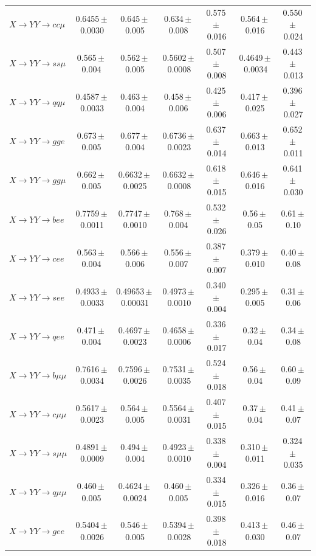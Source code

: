 \documentclass[12pt]{article}   %
\begin{document}
\begin{landscape}
{\begin{longtable}{@{\extracolsep{\fill}}lcccccc@{}}
$X\to YY\to cc\mu$ & 0.6455\,$\pm$\,0.0030 & 0.645\,$\pm$\,0.005 & 0.634\,$\pm$\,0.008 & 0.575\,$\pm$\,0.016 & 0.564\,$\pm$\,0.016 & 0.550\,$\pm$\,0.024 \\
$X\to YY\to ss\mu$ & 0.565\,$\pm$\,0.004 & 0.562\,$\pm$\,0.005 & 0.5602\,$\pm$\,0.0008 & 0.507\,$\pm$\,0.008 & 0.4649\,$\pm$\,0.0034 & 0.443\,$\pm$\,0.013 \\
$X\to YY\to qq\mu$ & 0.4587\,$\pm$\,0.0033 & 0.463\,$\pm$\,0.004 & 0.458\,$\pm$\,0.006 & 0.425\,$\pm$\,0.006 & 0.417\,$\pm$\,0.025 & 0.396\,$\pm$\,0.027 \\
$X\to YY\to gge$ & 0.673\,$\pm$\,0.005 & 0.677\,$\pm$\,0.004 & 0.6736\,$\pm$\,0.0023 & 0.637\,$\pm$\,0.014 & 0.663\,$\pm$\,0.013 & 0.652\,$\pm$\,0.011 \\
$X\to YY\to gg\mu$ & 0.662\,$\pm$\,0.005 & 0.6632\,$\pm$\,0.0025 & 0.6632\,$\pm$\,0.0008 & 0.618\,$\pm$\,0.015 & 0.646\,$\pm$\,0.016 & 0.641\,$\pm$\,0.030 \\
\midrule
$X\to YY\to bee$ & 0.7759\,$\pm$\,0.0011 & 0.7747\,$\pm$\,0.0010 & 0.768\,$\pm$\,0.004 & 0.532\,$\pm$\,0.026 & 0.56\,$\pm$\,0.05 & 0.61\,$\pm$\,0.10 \\
$X\to YY\to cee$ & 0.563\,$\pm$\,0.004 & 0.566\,$\pm$\,0.006 & 0.556\,$\pm$\,0.007 & 0.387\,$\pm$\,0.007 & 0.379\,$\pm$\,0.010 & 0.40\,$\pm$\,0.08 \\
$X\to YY\to see$ & 0.4933\,$\pm$\,0.0033 & 0.49653\,$\pm$\,0.00031 & 0.4973\,$\pm$\,0.0010 & 0.340\,$\pm$\,0.004 & 0.295\,$\pm$\,0.005 & 0.31\,$\pm$\,0.06 \\
$X\to YY\to qee$ & 0.471\,$\pm$\,0.004 & 0.4697\,$\pm$\,0.0023 & 0.4658\,$\pm$\,0.0006 & 0.336\,$\pm$\,0.017 & 0.32\,$\pm$\,0.04 & 0.34\,$\pm$\,0.08 \\
$X\to YY\to b\mu\mu$ & 0.7616\,$\pm$\,0.0034 & 0.7596\,$\pm$\,0.0026 & 0.7531\,$\pm$\,0.0035 & 0.524\,$\pm$\,0.018 & 0.56\,$\pm$\,0.04 & 0.60\,$\pm$\,0.09 \\
$X\to YY\to c\mu\mu$ & 0.5617\,$\pm$\,0.0023 & 0.564\,$\pm$\,0.005 & 0.5564\,$\pm$\,0.0031 & 0.407\,$\pm$\,0.015 & 0.37\,$\pm$\,0.04 & 0.41\,$\pm$\,0.07 \\
$X\to YY\to s\mu\mu$ & 0.4891\,$\pm$\,0.0009 & 0.494\,$\pm$\,0.004 & 0.4923\,$\pm$\,0.0010 & 0.338\,$\pm$\,0.004 & 0.310\,$\pm$\,0.011 & 0.324\,$\pm$\,0.035 \\
$X\to YY\to q\mu\mu$ & 0.460\,$\pm$\,0.005 & 0.4624\,$\pm$\,0.0024 & 0.460\,$\pm$\,0.005 & 0.334\,$\pm$\,0.015 & 0.326\,$\pm$\,0.016 & 0.36\,$\pm$\,0.07 \\
$X\to YY\to gee$ & 0.5404\,$\pm$\,0.0026 & 0.546\,$\pm$\,0.005 & 0.5394\,$\pm$\,0.0028 & 0.398\,$\pm$\,0.018 & 0.413\,$\pm$\,0.030 & 0.46\,$\pm$\,0.07 \\

\end{longtable}}
\end{landscape}
\end{document}
